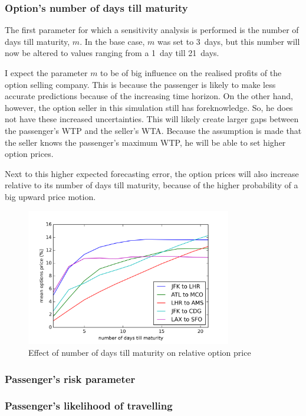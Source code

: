 \subsubsection{Option's number of days till maturity}
The first parameter for which a sensitivity analysis is performed is the number of days till maturity, $m$. In the base case, $m$ was set to 3~days, but this number will now be altered to values ranging from a 1~day till 21~days.

I expect the parameter $m$ to be of big influence on the realised profits of the option selling company. This is because the passenger is likely to make less accurate predictions because of the increasing time horizon. On the other hand, however, the option seller in this simulation still has foreknowledge. So, he does not have these increased uncertainties. This will likely create larger gaps between the passenger's WTP and the seller's WTA. Because the assumption is made that the seller knows the passenger's maximum WTP, he will be able to set higher option prices.

Next to this higher expected forecasting error, the option prices will also increase relative to its number of days till maturity, because of the higher probability of a big upward price motion.


\begin{figure}
    \centering
    \includegraphics[width=0.8\textwidth]{figures/Sensitivity_maturity}
    \caption{Effect of number of days till maturity on relative option price}
    \label{fig:SensitivityMaturity}
\end{figure}



\subsubsection{Passenger's risk parameter}

\subsubsection{Passenger's likelihood of travelling}



